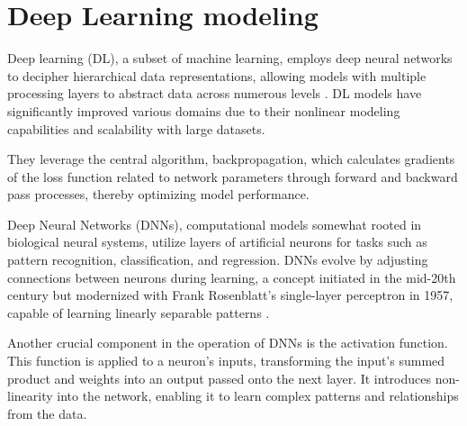 \section{Deep Learning modeling}

Deep learning (DL), a subset of machine learning, employs deep neural networks to decipher hierarchical data representations, allowing models with multiple processing layers to abstract data across numerous levels \cite{LeCun2015DeepLearning}. DL models have significantly improved various domains due to their nonlinear modeling capabilities and scalability with large datasets.

They leverage the central algorithm, backpropagation, which calculates gradients of the loss function related to network parameters through forward and backward pass processes, thereby optimizing model performance.



Deep Neural Networks (DNNs), computational models somewhat rooted in biological neural systems, utilize layers of artificial neurons for tasks such as pattern recognition, classification, and regression. DNNs evolve by adjusting connections between neurons during learning, a concept initiated in the mid-20th century but modernized with Frank Rosenblatt's single-layer perceptron in 1957, capable of learning linearly separable patterns \cite{perceptron}.



Another crucial component in the operation of DNNs is the activation function. This function is applied to a neuron's inputs, transforming the input's summed product and weights into an output passed onto the next layer. It introduces non-linearity into the network, enabling it to learn complex patterns and relationships from the data.



\newpage